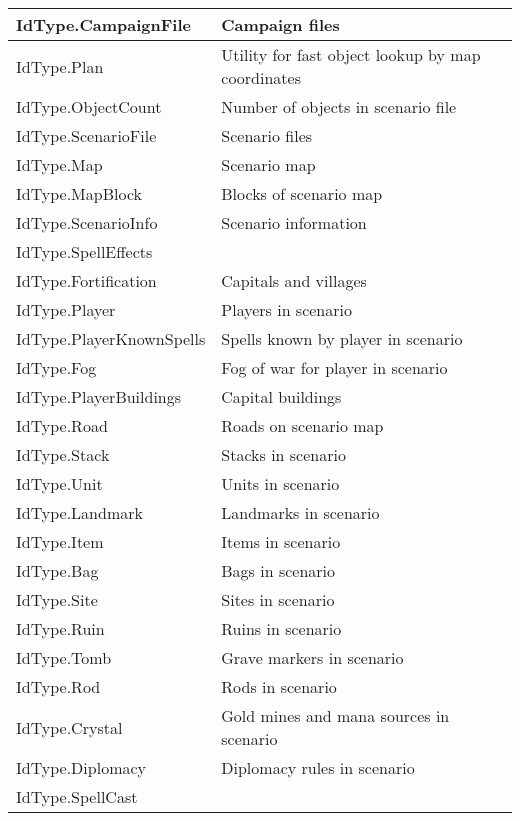 \begin{tabularx}{\linewidth}{| l | X |}
\hline
IdType.CampaignFile & Campaign files\\
\hline
IdType.Plan & Utility for fast object lookup by map coordinates\\
\hline
IdType.ObjectCount & Number of objects in scenario file\\
\hline
IdType.ScenarioFile & Scenario files\\
\hline
IdType.Map & Scenario map\\
\hline
IdType.MapBlock & Blocks of scenario map\\
\hline
IdType.ScenarioInfo & Scenario information\\
\hline
IdType.SpellEffects &\\
\hline
IdType.Fortification & Capitals and villages\\
\hline
IdType.Player & Players in scenario\\
\hline
IdType.PlayerKnownSpells & Spells known by player in scenario\\
\hline
IdType.Fog & Fog of war for player in scenario\\
\hline
IdType.PlayerBuildings & Capital buildings\\
\hline
IdType.Road & Roads on scenario map\\
\hline
IdType.Stack & Stacks in scenario\\
\hline
IdType.Unit & Units in scenario\\
\hline
IdType.Landmark & Landmarks in scenario\\
\hline
IdType.Item & Items in scenario\\
\hline
IdType.Bag & Bags in scenario\\
\hline
IdType.Site & Sites in scenario\\
\hline
IdType.Ruin & Ruins in scenario\\
\hline
IdType.Tomb & Grave markers in scenario\\
\hline
IdType.Rod & Rods in scenario\\
\hline
IdType.Crystal & Gold mines and mana sources in scenario\\
\hline
IdType.Diplomacy & Diplomacy rules in scenario\\
\hline
IdType.SpellCast &\\
\hline
\end{tabularx}
